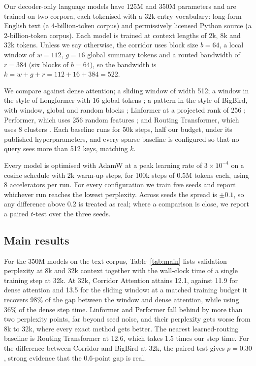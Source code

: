 \documentclass[11pt]{article}
\begin{document}
Our decoder-only language models have 125M and 350M parameters and are
trained on two corpora, each tokenised with a 32k-entry vocabulary: long-form
English text (a 4-billion-token corpus) and permissively licensed Python
source (a 2-billion-token corpus). Each model is trained at context lengths
of 2k, 8k and 32k tokens. Unless we say otherwise, the corridor uses
block size $b = 64$, a local window of $w = 112$, $g = 16$ global summary
tokens and a routed bandwidth of $r = 384$ (six blocks of $b = 64$), so the
bandwidth is $k = w + g + r = 112 + 16 + 384 = 522$.

We compare against dense attention; a sliding window of width 512; a window
in the style of Longformer with 16 global tokens \citep{beltagy2020longformer};
a pattern in the style of BigBird, with window, global and random blocks
\citep{zaheer2020bigbird}; Linformer at a projected rank of 256
\citep{wang2020linformer}; Performer, which uses 256 random features
\citep{choromanski2021performer}; and Routing Transformer, which uses 8
clusters \citep{roy2021efficient}. Each baseline runs for 50k steps, half our
budget, under its published hyperparameters, and every sparse baseline is
configured so that no query sees more than 512 keys, matching $k$.

Every model is optimised with AdamW at a peak learning rate of
$3 \times 10^{-4}$ on a cosine schedule with 2k warm-up steps, for 100k
steps of 0.5M tokens each, using 8 accelerators per run. For every
configuration we train five seeds and report whichever run reaches the lowest
perplexity. Across seeds the spread is $\pm 0.1$, so any difference above
$0.2$ is treated as real; where a comparison is close, we report a paired
$t$-test over the three seeds.

\subsection{Main results}\label{sec:main}

For the 350M models on the text corpus, Table~\ref{tab:main} lists validation
perplexity at 8k and 32k context together with the wall-clock time of a
single training step at 32k. At 32k, Corridor Attention attains 12.1, against
11.9 for dense attention and 13.5 for the sliding window: at a matched
training budget it recovers 98\% of the gap between the window and dense
attention, while using 36\% of the dense step time. Linformer and Performer
fall behind by more than two perplexity points, far beyond seed noise, and
their perplexity gets worse from 8k to 32k, where every exact method gets
better. The nearest learned-routing baseline is Routing Transformer at 12.6,
which takes 1.5 times our step time. For the difference between Corridor and
BigBird at 32k, the paired test gives $p = 0.30$, strong evidence that the
0.6-point gap is real.
\end{document}
